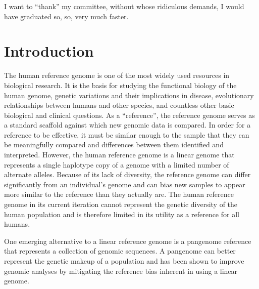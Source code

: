 \documentclass[11pt]{ucscthesis}
\begin{document}
\begin{frontmatter}
\begin{acknowledgements}
I want to ``thank'' my committee, without whose ridiculous demands, I
would have graduated so, so, very much faster.
\end{acknowledgements}

\end{frontmatter}


\chapter{Introduction}

The human reference genome is one of the most widely used resources in biological research.
It is the basis for studying the functional biology of the human genome, genetic variations and their implications in disease, evolutionary relationships between humans and other species, and countless other basic biological and clinical questions.
As a ``reference'', the reference genome serves as a standard scaffold against which new genomic data is compared.
In order for a reference to be effective, it must be similar enough to the sample that they can be meaningfully compared and differences between them identified and interpreted.
However, the human reference genome is a linear genome that represents a single haplotype copy of a genome with a limited number of alternate alleles.
Because of its lack of diversity, the reference genome can differ significantly from an individual's genome and can bias new samples to appear more similar to the reference than they actually are.
The human reference genome in its current iteration cannot represent the genetic diversity of the human population and is therefore limited in its utility as a reference for all humans.

One emerging alternative to a linear reference genome is a pangenome reference that represents a collection of genomic sequences.
A pangenome can better represent the genetic makeup of a population and has been shown to improve genomic analyses by mitigating the reference bias inherent in using a linear genome.
\end{document}
